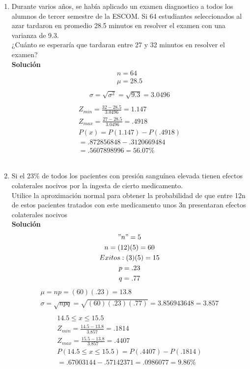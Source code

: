 \documentclass[11pt,a4paper]{article}
\begin{document}
\begin{enumerate}
	\item Durante varios años, se había aplicado un examen diagnostico a todos los alumnos de tercer semestre de la ESCOM. Si 64 estudiantes seleccionados al azar tardaron en promedio 28.5 minutos en resolver el examen con una varianza de 9.3.\\
¿Cuánto se esperaría que tardaran entre 27 y 32 minutos en resolver el examen?
	\\\textbf{Solución}
	\begin{gather*}
		 n	= 64\\
		 \mu = 28.5\\		 
	\end{gather*}
	\begin{gather*}
		 \sigma = \sqrt{\sigma^{2}} = \sqrt{9.3} = 3.0496\\
	\end{gather*}
	\begin{gather*}	 
	 Z_{min} = \frac{32 - 28.5}{3.0496} = 1.147\\
	 Z_{max} = \frac{27 - 28.5}{3.0496} = .4918\\
	 P(x) = P(1.147) - P(.4918)\\ = .872856848 - .3120669484\\ = .5607898996 = 56.07\%
	\end{gather*}\\
	\item Si el 23\% de todos los pacientes con presión sanguínea elevada tienen efectos colaterales nocivos por la ingesta de cierto medicamento.\\
Utilice la aproximación normal para obtener la probabilidad de que entre 12n de estos pacientes tratados con este medicamento unos 3n presentaran efectos colaterales nocivos
	\\\textbf{Solución}
	\begin{gather*}
		"n" = 5\\
		 n	= (12)(5) = 60\\
		 Exitos : (3)(5) = 15\\
		 p = .23\\
		 q = .77\\		 
	\end{gather*}
	\begin{gather*}
		\mu = np = (60)(.23) = 13.8\\
		 \sigma = \sqrt{npq} = \sqrt{(60)(.23)(.77)} = 3.856943648 = 3.857\\
	\end{gather*}
	\begin{gather*}	 
	 14.5 \leqslant x \leqslant 15.5\\	
	 Z_{min} = \frac{14.5 - 13.8}{3.857} = .1814\\
	 Z_{max} = \frac{15.5 - 13.8}{3.857} = .4407\\
	 P(14.5 \leqslant x \leqslant 15.5) =  P(.4407) - P(.1814)\\ = .67003144 - .57142371 = .0986077 = 9.86\%
	\end{gather*}
	
\end{enumerate}
\end{document}
